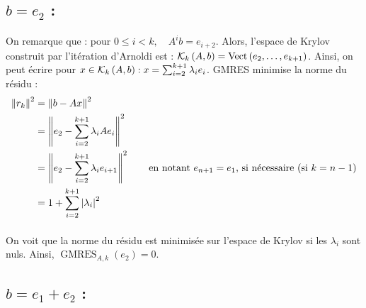 \subsection*{\underline{$b = e_2$} :}

  \paragraph{}
  On remarque que : pour $0 \le i < k,\quad A^ib = e_{i + 2}$.
  Alors, l'espace de Krylov construit par l'itération d'Arnoldi est : $\krylov[A, b]{k} = \operatorname{Vect}\left(e_2, \dots, e_{k+1}\right)$.
  Ainsi, on peut écrire pour $x\in\krylov[A, b]{k} : x = \sum_{i=2}^{k+1} \lambda_i e_i$.
  GMRES minimise la norme du résidu :
  \begin{align*}
    \norm{r_k}^2 &= \norm{b - Ax}^2 \\
                 &= \norm{e_2 - \sum_{i=2}^{k+1} \lambda_i Ae_i}^2 \\
                 &= \norm{e_2 - \sum_{i=2}^{k+1} \lambda_i e_{i+1}}^2 \qquad\textrm{en notant $e_{n+1} = e_1$, si nécessaire (si $k = n-1$)}\\
                 &= 1 + \sum_{i=2}^{k+1} \left|\lambda_i\right|^2
  \end{align*}

  \paragraph{}
  On voit que la norme du résidu est minimisée sur l'espace de Krylov si les $\lambda_{i}$ sont nuls.
  Ainsi, $\operatorname{GMRES}_{A, k}\left(e_2\right) = 0$.

\subsection*{\underline{$b = e_1 + e_2$} :}

